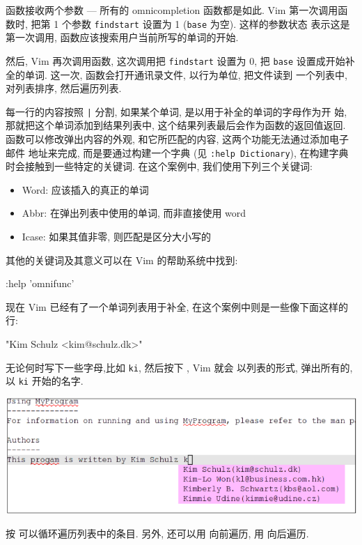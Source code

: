 函数接收两个参数 --- 所有的 omnicompletion 函数都是如此. Vim 第一次调用函数时,
把第 1 个参数 \texttt{findstart} 设置为 1 (\texttt{base} 为空). 这样的参数状态
表示这是第一次调用, 函数应该搜索用户当前所写的单词的开始.

然后, Vim 再次调用函数, 这次调用把 \texttt{findstart} 设置为 0, 把 \texttt{base}
设置成开始补全的单词. 这一次, 函数会打开通讯录文件, 以行为单位, 把文件读到
一个列表中, 对列表排序, 然后遍历列表.

每一行的内容按照 \texttt{|} 分割, 如果某个单词, 是以用于补全的单词的字母作为开
始, 那就把这个单词添加到结果列表中, 这个结果列表最后会作为函数的返回值返回.
函数可以修改弹出内容的外观, 和它所匹配的内容, 这两个功能无法通过添加电子邮件
地址来完成, 而是要通过构建一个字典 (见 \texttt{:help Dictionary}), 在构建字典
时会接触到一些特定的关键词. 在这个案例中, 我们使用下列三个关键词:
\begin{itemize}
    \item Word: 应该插入的真正的单词
    \item Abbr: 在弹出列表中使用的单词, 而非直接使用 word
    \item Icase: 如果其值非零, 则匹配是区分大小写的
\end{itemize}

其他的关键词及其意义可以在 Vim 的帮助系统中找到:
\begin{vimcode}
:help 'omnifunc'
\end{vimcode}

现在 Vim 已经有了一个单词列表用于补全, 在这个案例中则是一些像下面这样的行:
\begin{vimcode}
"Kim Schulz <kim@schulz.dk>"
\end{vimcode}
无论何时写下一些字母,比如 \texttt{ki}, 然后按下 , Vim 就会 
以列表的形式, 弹出所有的, 以 \texttt{ki} 开始的名字.
\begin{center}
    \includegraphics[scale=0.55]{./images/page89.png}
\end{center}
按  可以循环遍历列表中的条目. 另外, 还可以用  向前遍历,
用  向后遍历.

